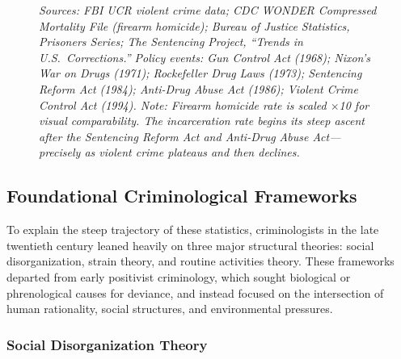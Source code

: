 \documentclass[
]{article}
\newcounter{none} %
\begin{document}
\begin{figure}[ht]
\caption*{\emph{Sources: FBI UCR violent crime data; CDC WONDER Compressed Mortality File (firearm homicide); Bureau of Justice Statistics, Prisoners Series; The Sentencing Project, ``Trends in U.S.\ Corrections.'' Policy events: Gun Control Act (1968); Nixon's War on Drugs (1971); Rockefeller Drug Laws (1973); Sentencing Reform Act (1984); Anti-Drug Abuse Act (1986); Violent Crime Control Act (1994). Note: Firearm homicide rate is scaled $\times$10 for visual comparability. The incarceration rate begins its steep ascent after the Sentencing Reform Act and Anti-Drug Abuse Act---precisely as violent crime plateaus and then declines.}}
\end{figure}

\clearpage

\subsection{\texorpdfstring{\textbf{Foundational Criminological
Frameworks}}{Foundational Criminological Frameworks}}\label{foundational-criminological-frameworks}

To explain the steep trajectory of these statistics, criminologists in
the late twentieth century leaned heavily on three major structural
theories: social disorganization, strain theory, and routine activities
theory. These frameworks departed from early positivist criminology,
which sought biological or phrenological causes for deviance, and
instead focused on the intersection of human rationality, social
structures, and environmental pressures.

\subsubsection{\texorpdfstring{\textbf{Social Disorganization
Theory}}{Social Disorganization Theory}}\label{social-disorganization-theory}
\end{document}
